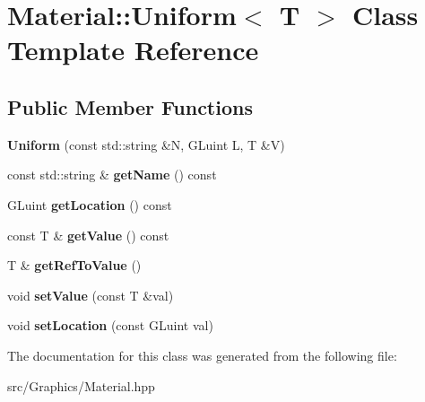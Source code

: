 \hypertarget{class_material_1_1_uniform}{\section{Material\+:\+:Uniform$<$ T $>$ Class Template Reference}
\label{class_material_1_1_uniform}
}
\subsection*{Public Member Functions}
\begin{DoxyCompactItemize}
\item 
\hypertarget{class_material_1_1_uniform_a6912f28ba6af514c004e35eb9d6ea9ac}{{\bfseries Uniform} (const std\+::string \&N, G\+Luint L, T \&V)}\label{class_material_1_1_uniform_a6912f28ba6af514c004e35eb9d6ea9ac}

\item 
\hypertarget{class_material_1_1_uniform_a903bf4b04b191c5e543de6b0b10d03e9}{const std\+::string \& {\bfseries get\+Name} () const }\label{class_material_1_1_uniform_a903bf4b04b191c5e543de6b0b10d03e9}

\item 
\hypertarget{class_material_1_1_uniform_ab574c10af2d35fecb57a80c15b874168}{G\+Luint {\bfseries get\+Location} () const }\label{class_material_1_1_uniform_ab574c10af2d35fecb57a80c15b874168}

\item 
\hypertarget{class_material_1_1_uniform_ac7387f4672029743feb6ff0cf6446d93}{const T \& {\bfseries get\+Value} () const }\label{class_material_1_1_uniform_ac7387f4672029743feb6ff0cf6446d93}

\item 
\hypertarget{class_material_1_1_uniform_a3fa5fa36c8804f508868ef6a7a300bc8}{T \& {\bfseries get\+Ref\+To\+Value} ()}\label{class_material_1_1_uniform_a3fa5fa36c8804f508868ef6a7a300bc8}

\item 
\hypertarget{class_material_1_1_uniform_ab28ca1784fbe6386966298b257150987}{void {\bfseries set\+Value} (const T \&val)}\label{class_material_1_1_uniform_ab28ca1784fbe6386966298b257150987}

\item 
\hypertarget{class_material_1_1_uniform_a5d61dff1eeb82a8c4b962ce2af0a1c8f}{void {\bfseries set\+Location} (const G\+Luint val)}\label{class_material_1_1_uniform_a5d61dff1eeb82a8c4b962ce2af0a1c8f}

\end{DoxyCompactItemize}


The documentation for this class was generated from the following file\+:\begin{DoxyCompactItemize}
\item 
src/\+Graphics/Material.\+hpp\end{DoxyCompactItemize}
